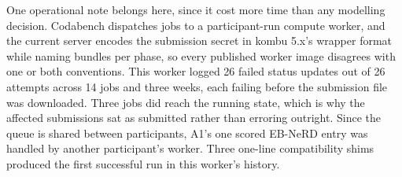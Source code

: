 \documentclass[11pt]{article}
\begin{document}
One operational note belongs here, since it cost more time than any modelling
decision. Codabench dispatches jobs to a participant-run compute worker, and
the current server encodes the submission secret in kombu 5.x's wrapper format
while naming bundles per phase, so every published worker image disagrees with
one or both conventions. This worker logged 26 failed status updates out of 26
attempts across 14 jobs and three weeks, each failing before the submission
file was downloaded. Three jobs did reach the running state, which is why the
affected submissions sat as submitted rather than erroring outright. Since the
queue is shared between participants, A1's one scored EB-NeRD entry was
handled by another participant's worker. Three one-line compatibility shims
produced the first successful run in this worker's history.
\end{document}
